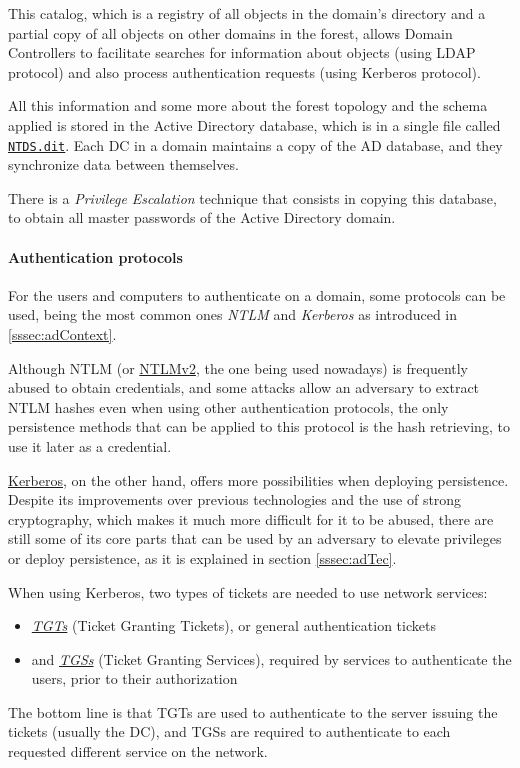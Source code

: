 This catalog, which is a registry of all objects in the domain’s directory and a partial copy of all objects on other domains in the forest, allows Domain Controllers to facilitate searches for information about objects (using LDAP protocol) and also process authentication requests (using Kerberos protocol).

All this information and some more about the forest topology and the schema applied is stored in the Active Directory database, which is in a single file called \underline{\texttt{NTDS.dit}}. Each DC in a domain maintains a copy of the AD database, and they synchronize data between themselves.

There is a \textit{Privilege Escalation} technique\cite{MitreNTDS} that consists in copying this database, to obtain all master passwords of the Active Directory domain.

\paragraph{Authentication protocols}

For the users and computers to authenticate on a domain, some protocols can be used, being the most common ones \textit{NTLM} and \textit{Kerberos} as introduced in \ref{sssec:adContext}.

Although NTLM (or \underline{NTLMv2}, the one being used nowadays) is frequently abused to obtain credentials, and some attacks allow an adversary to extract NTLM hashes even when using other authentication protocols, the only persistence methods that can be applied to this protocol is the hash retrieving, to use it later as a credential.
 
\underline{Kerberos}, on the other hand, offers more possibilities when deploying persistence. Despite its improvements over previous technologies and the use of strong cryptography, which makes it much more difficult for it to be abused, there are still some of its core parts that can be used by an adversary to elevate privileges or deploy persistence, as it is explained in section \ref{sssec:adTec}.

When using Kerberos, two types of tickets are needed to use network services\cite{GoldenTicket1}: 
\begin{itemize}
\item \underline{\textit{TGTs}} (Ticket Granting Tickets), or general authentication tickets 
\item and \underline{\textit{TGSs}} (Ticket Granting Services), required by services to authenticate the users, prior to their authorization
\end{itemize} 
The bottom line is that TGTs are used to authenticate to the server issuing the tickets (usually the DC), and TGSs are required to authenticate to each requested different service on the network.

